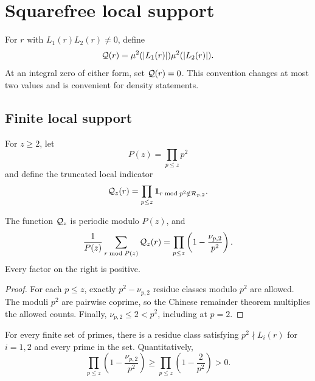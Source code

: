 \section{Squarefree local support}
\label{sec:squarefree-support}

For \(r\) with \(L_1(r)L_2(r)\ne0\), define
\begin{equation}
 \mathcal Q(r)
 =
 \mu^2(|L_1(r)|)\mu^2(|L_2(r)|).
\label{eq:squarefree-support}
\end{equation}
At an integral zero of either form, set \(\mathcal Q(r)=0\).  This
convention changes at most two values and is convenient for density
statements.

\subsection{Finite local support}

For \(z\ge2\), let
\[
 P(z)=\prod_{p\le z}p^2
\]
and define the truncated local indicator
\begin{equation}
 \mathcal Q_z(r)
 =
 \prod_{p\le z}
 \mathbf 1_{r\bmod p^2\notin\mathcal R_{p,2}}.
\label{eq:truncated-support}
\end{equation}

\begin{theorem}
\label{thm:finite-local-density}
The function \(\mathcal Q_z\) is periodic modulo \(P(z)\), and
\begin{equation}
 \frac1{P(z)}
 \sum_{r\bmod P(z)}\mathcal Q_z(r)
 =
 \prod_{p\le z}
 \left(1-\frac{\nu_{p,2}}{p^2}\right).
\label{eq:finite-local-product}
\end{equation}
Every factor on the right is positive.
\end{theorem}

\begin{proof}
For each \(p\le z\), exactly \(p^2-\nu_{p,2}\) residue classes
modulo \(p^2\) are allowed.  The moduli \(p^2\) are pairwise
coprime, so the Chinese remainder theorem multiplies the allowed
counts.  Finally, \(\nu_{p,2}\le2<p^2\), including at \(p=2\).
\end{proof}

\begin{corollary}
\label{cor:no-squarefree-local-annihilation}
For every finite set of primes, there is a residue class satisfying
\(p^2\nmid L_i(r)\) for \(i=1,2\) and every prime in the set.
Quantitatively,
\begin{equation}
 \prod_{p\le z}
 \left(1-\frac{\nu_{p,2}}{p^2}\right)
 \ge
 \prod_{p\le z}\left(1-\frac2{p^2}\right)>0.
\label{eq:finite-universal-lower}
\end{equation}
\end{corollary}

